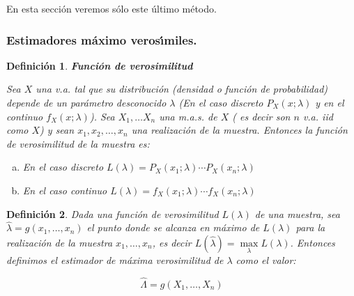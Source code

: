 \documentclass[12pt]{report}
\newtheorem{definition}{Definici\'on}
\begin{document}
En esta secci\'on veremos s\'olo este \'ultimo m\'etodo.

\subsubsection{Estimadores m\'aximo veros\'{\i}miles.}

\begin{definition}\textbf{Funci\'on de verosimilitud}

Sea $X$ una v.a. tal que su distribuci\'on (densidad o funci\'on de probabilidad) depende de un
par\'ametro desconocido $\lambda$ (En el caso discreto $P_X(x;\lambda)$ y en el continuo
$f_X(x;\lambda)$). Sea $X_{1},\ldots X_{n}$ una m.a.s. de $X$ ( es decir son $n$ v.a. iid
como $X$) y sean $x_1,x_2,\ldots,x_n$ una realizaci\'on de la muestra. Entonces la funci\'on de
verosimilitud de la muestra es:

\begin{enumerate}[a)]
\item En el caso discreto $L(\lambda)=P_X(x_1;\lambda)\cdots P_X(x_n;\lambda)$
\item En el caso continuo $L(\lambda)=f_X(x_1;\lambda)\cdots f_X(x_n;\lambda)$

\end{enumerate}
\end{definition}

\begin{definition}  Dada una funci\'on de verosimilitud $L(\lambda)$ de una muestra, sea
$\hat{\lambda}=g(x_1,\ldots,x_n)$ el punto donde se alcanza en m\'aximo de $L(\lambda)$ para
la realizaci\'on de la muestra $x_1,\ldots,x_n$, es decir
$L(\hat{\lambda})=\max\limits_{\lambda} L(\lambda)$. Entonces definimos el estimador de
m\'axima verosimilitud de $\lambda$ como el valor:

$$\hat{\Lambda}=g(X_1,\ldots,X_n)$$

\end{definition}
\end{document}
